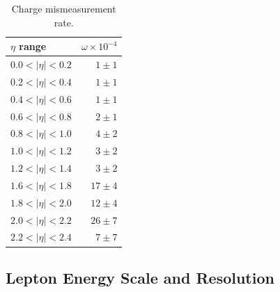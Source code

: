 \begin{table}[htb]
  \begin{center}
\begin{tabular}{lr}
$\eta$ range        & $\omega \times 10^{-4}$    \\
\hline
$0.0<| \eta |<0.2$  & $ 1 \pm 1 $    \\ 
$0.2<| \eta |<0.4$  & $ 1 \pm 1 $    \\
$0.4<| \eta |<0.6$  & $ 1 \pm 1 $    \\
$0.6<| \eta |<0.8$  & $ 2 \pm 1 $    \\
$0.8<| \eta |<1.0$  & $ 4 \pm 2 $    \\ 
$1.0<| \eta |<1.2$  & $ 3 \pm 2 $    \\
$1.2<| \eta |<1.4$  & $ 3 \pm 2 $    \\
$1.6<| \eta |<1.8$  & $17 \pm 4 $    \\
$1.8<| \eta |<2.0$  & $12 \pm 4 $    \\
$2.0<| \eta |<2.2$  & $26 \pm 7 $    \\
$2.2<| \eta |<2.4$  & $ 7 \pm 7 $    \\
\end{tabular}
\caption{\label{tab:mischarge}Charge mismeasurement rate.}
\end{center}
\end{table}


\subsection{Lepton Energy Scale and Resolution}



